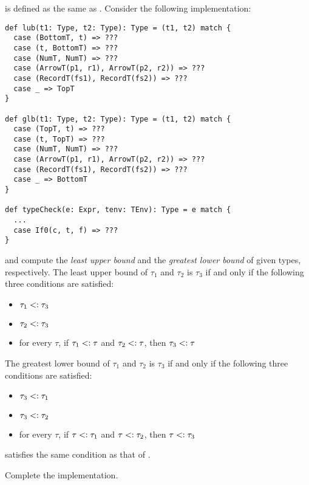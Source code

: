 \begin{exercise}

 is defined as the same as .
Consider the following implementation:

\begin{verbatim}
def lub(t1: Type, t2: Type): Type = (t1, t2) match {
  case (BottomT, t) => ???
  case (t, BottomT) => ???
  case (NumT, NumT) => ???
  case (ArrowT(p1, r1), ArrowT(p2, r2)) => ???
  case (RecordT(fs1), RecordT(fs2)) => ???
  case _ => TopT
}

def glb(t1: Type, t2: Type): Type = (t1, t2) match {
  case (TopT, t) => ???
  case (t, TopT) => ???
  case (NumT, NumT) => ???
  case (ArrowT(p1, r1), ArrowT(p2, r2)) => ???
  case (RecordT(fs1), RecordT(fs2)) => ???
  case _ => BottomT
}

def typeCheck(e: Expr, tenv: TEnv): Type = e match {
  ...
  case If0(c, t, f) => ???
}
\end{verbatim}

 and  compute the \emph{least upper bound} and the
\emph{greatest lower bound} of given types, respectively.
The least upper bound of $\tau_1$ and $\tau_2$ is $\tau_3$ if and only if
the following three conditions are satisfied:

\begin{itemize}
  \item $\tau_1<:\tau_3$
  \item $\tau_2<:\tau_3$
  \item for every $\tau$, if $\tau_1<:\tau$ and $\tau_2<:\tau$,
    then $\tau_3<:\tau$
\end{itemize}

The greatest lower bound of $\tau_1$ and $\tau_2$ is $\tau_3$ if and only if
the following three conditions are satisfied:

\begin{itemize}
  \item $\tau_3<:\tau_1$
  \item $\tau_3<:\tau_2$
  \item for every $\tau$, if $\tau<:\tau_1$ and $\tau<:\tau_2$,
    then $\tau<:\tau_3$
\end{itemize}

 satisfies the same condition as that of
.

Complete the implementation.

\end{exercise}

